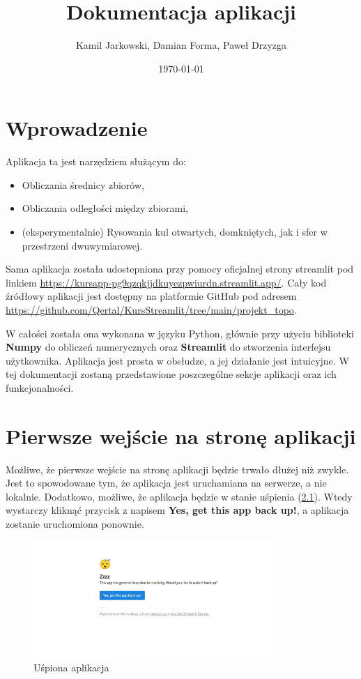 \documentclass[article,11pt]{mwrep}
\title{Dokumentacja aplikacji}
\author{Kamil Jarkowski, Damian Forma, Paweł Drzyzga}
\date{\today}
\begin{document}
\maketitle

\chapter{Wprowadzenie}

Aplikacja ta jest narzędziem służącym do:
\begin{itemize}
    \item Obliczania średnicy zbiorów,
    \item Obliczania odległości między zbiorami,
    \item (eksperymentalnie) Rysowania kul otwartych, domkniętych, jak i sfer w przestrzeni dwuwymiarowej.
\end{itemize}


Sama aplikacja została udostepniona przy pomocy oficjalnej strony streamlit pod linkiem \url{https://kursapp-pg9qzqkjjdkuyezpwiurdn.streamlit.app/}. Cały kod źródłowy aplikacji jest dostępny na platformie GitHub pod adresem \url{https://github.com/Qertal/KursStreamlit/tree/main/projekt_topo}.

W całości została ona wykonana w języku Python, głównie przy użyciu biblioteki \textbf{Numpy} do obliczeń numerycznych oraz \textbf{Streamlit} do stworzenia interfejsu użytkownika. Aplikacja jest prosta w obsłudze, a jej działanie jest intuicyjne. W tej dokumentacji zostaną przedstawione poszczególne sekcje aplikacji oraz ich funkcjonalności.

\chapter{Pierwsze wejście na stronę aplikacji}

Możliwe, że pierwsze wejście na stronę aplikacji będzie trwało dłużej niż zwykle. Jest to spowodowane tym, że aplikacja jest uruchamiana na serwerze, a nie lokalnie. Dodatkowo, możliwe, że aplikacja będzie w stanie uśpienia (\ref{rys:usp}). Wtedy wystarczy kliknąć przycisk z napisem \textbf{Yes, get this app back up!}, a aplikacja zostanie uruchomiona ponownie.


\begin{figure}[H] 
    \centering
    \includegraphics[width=0.8\textwidth]{figure/Obraz1.png}
    \caption{Uśpiona aplikacja}\label{rys:usp}
\end{figure}
\end{document}
